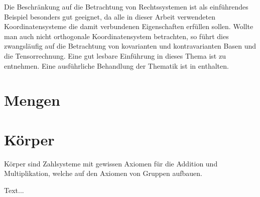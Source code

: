   \begin{rem} Die Beschr\"ankung auf die Betrachtung von Rechtssystemen ist als einf\"uhrendes Beispiel besonders gut geeignet, da alle in dieser Arbeit verwendeten Koordinatensysteme die damit verbundenen Eigenschaften erf\"ullen sollen. Wollte man auch nicht orthogonale Koordinatensystem betrachten, so f\"uhrt dies zwangsl\"aufig auf die Betrachtung von kovarianten und kontravarianten Basen und die Tensorrechnung. Eine gut lesbare Einf\"uhrung in dieses Thema ist \cite{Roethlisberger2007} zu entnehmen. Eine ausf\"uhrliche Behandlung der Thematik ist in \cite{Jaenich2005} enthalten. 
  \end{rem}
  
   
  \section{Mengen}\label{sec:mathGrundl_mengen}
  \section{K\"orper}\label{sec:mathGrundl_koerper}
  K\"orper sind Zahlsysteme mit gewissen Axiomen f\"ur die Addition und Multiplikation, welche auf den Axiomen von Gruppen aufbauen. \newline
  
  Text...
  
